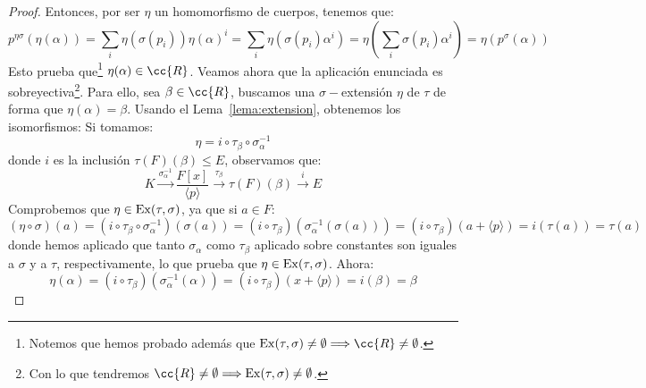 \begin{prop}[Extensión I]
\begin{proof}
        Entonces, por ser $\eta$ un homomorfismo de cuerpos, tenemos que:
        \begin{equation*}
            p^{\eta\sigma}(\eta(\alpha)) = \sum_i \eta(\sigma(p_i)) \eta(\alpha)^i = \sum_i \eta(\sigma(p_i)\alpha^i) = \eta\left(\sum_i \sigma(p_i) \alpha^i\right) = \eta(p^\sigma(\alpha))
        \end{equation*}
        Esto prueba que\footnote{Notemos que hemos probado además que $\Ex(\tau,\sigma)\neq \emptyset \Longrightarrow \cc{R}\neq \emptyset $.} $\eta(\alpha)\in \cc{R}$. Veamos ahora que la aplicación enunciada es sobreyectiva\footnote{Con lo que tendremos $\cc{R}\neq \emptyset \Longrightarrow \Ex(\tau,\sigma)\neq \emptyset $.}. Para ello, sea $\beta\in \cc{R}$, buscamos una $\sigma-$extensión $\eta$ de $\tau$ de forma que $\eta(\alpha) = \beta$. Usando el Lema~\ref{lema:extension}, obtenemos los isomorfismos:
        Si tomamos:
        \begin{equation*}
            \eta = i \circ \tau_\beta \circ \sigma_\alpha^{-1}
        \end{equation*}
        donde $i$ es la inclusión $\tau(F)(\beta)\leq E$, observamos que:
        \begin{equation*}
            K\stackrel{\sigma_\alpha^{-1}}{\longrightarrow} \frac{F[x]}{\langle p \rangle } \stackrel{\tau_\beta}{\longrightarrow} \tau(F)(\beta) \stackrel{i}{\longrightarrow} E
        \end{equation*}
        Comprobemos que $\eta\in \operatorname{Ex}(\tau,\sigma)$, ya que si $a\in F$:
        \begin{equation*}
            (\eta \circ \sigma)(a) = (i\circ \tau_\beta\circ \sigma_\alpha^{-1})(\sigma(a)) = (i\circ \tau_\beta)(\sigma_\alpha^{-1}(\sigma(a))) = (i\circ \tau_\beta)(a+\langle p \rangle ) = i(\tau(a)) = \tau(a)
        \end{equation*}
        donde hemos aplicado que tanto $\sigma_\alpha$ como $\tau_\beta$ aplicado sobre constantes son iguales a $\sigma$ y a $\tau$, respectivamente, lo que prueba que $\eta\in \operatorname{Ex}(\tau,\sigma)$. Ahora:
        \begin{equation*}
            \eta(\alpha) = (i\circ \tau_\beta)(\sigma_\alpha^{-1}(\alpha))= (i\circ \tau_\beta)(x+\langle p \rangle ) = i(\beta) = \beta
        \end{equation*}

\end{proof}
\end{prop}
